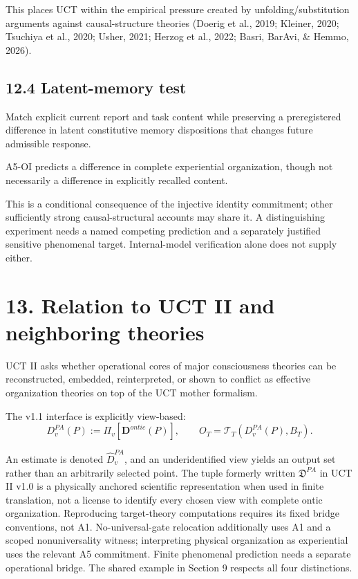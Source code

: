 \documentclass[
  11pt,
  a4paper,
]{article}
\begin{document}
This places UCT within the empirical pressure created by
unfolding/substitution arguments against causal-structure theories
(Doerig et al., 2019; Kleiner, 2020; Tsuchiya et al., 2020; Usher, 2021;
Herzog et al., 2022; Basri, BarAvi, \& Hemmo, 2026).

\hypertarget{latent-memory-test}{%
\subsection{12.4 Latent-memory test}\label{latent-memory-test}}

Match explicit current report and task content while preserving a
preregistered difference in latent constitutive memory dispositions that
changes future admissible response.

A5-OI predicts a difference in complete experiential organization,
though not necessarily a difference in explicitly recalled content.

This is a conditional consequence of the injective identity commitment;
other sufficiently strong causal-structural accounts may share it. A
distinguishing experiment needs a named competing prediction and a
separately justified sensitive phenomenal target. Internal-model
verification alone does not supply either.

\hypertarget{relation-to-uct-ii-and-neighboring-theories}{%
\section{13. Relation to UCT II and neighboring
theories}\label{relation-to-uct-ii-and-neighboring-theories}}

UCT II asks whether operational cores of major consciousness theories
can be reconstructed, embedded, reinterpreted, or shown to conflict as
effective organization theories on top of the UCT mother formalism.

The v1.1 interface is explicitly view-based:
\nopagebreak[4]
\[
D^{PA}_v(P):=\Pi_v[\mathbf D^{ontic}(P)],\qquad
O_T=\mathcal T_T(D^{PA}_v(P),B_T).
\]

An estimate is denoted \(\widehat D^{PA}_v\), and an underidentified
view yields an output set rather than an arbitrarily selected point. The
tuple formerly written \(\mathfrak D^{PA}\) in UCT II v1.0 is a
physically anchored scientific representation when used in finite
translation, not a license to identify every chosen view with complete
ontic organization. Reproducing target-theory computations requires its
fixed bridge conventions, not A1. No-universal-gate relocation
additionally uses A1 and a scoped nonuniversality witness; interpreting
physical organization as experiential uses the relevant A5 commitment.
Finite phenomenal prediction needs a separate operational bridge. The
shared example in Section 9 respects all four distinctions.
\end{document}
